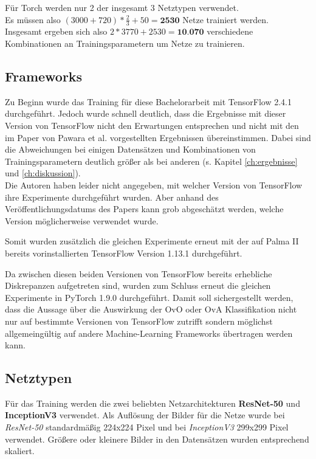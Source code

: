 Für Torch \cite{pytorch} werden nur 2 der insgesamt 3 Netztypen verwendet.\\
Es müssen also $(3000 + 720) * \frac{2}{3} + 50 = \textbf{2530}$ Netze trainiert werden.\\

Insgesamt ergeben sich also $2 * 3770 + 2530 = \textbf{10.070}$ verschiedene Kombinationen an Trainingsparametern um Netze zu trainieren.

\subsection{Frameworks}
Zu Beginn wurde das Training für diese Bachelorarbeit mit TensorFlow 2.4.1 \cite{tensorflow} durchgeführt. Jedoch wurde schnell deutlich, dass die Ergebnisse mit dieser Version von TensorFlow nicht den Erwartungen entsprechen und nicht mit den im Paper von Pawara et al. \cite{pawaraPaper} vorgestellten Ergebnissen übereinstimmen. Dabei sind die Abweichungen bei einigen Datensätzen und Kombinationen von Trainingsparametern deutlich größer als bei anderen (s. Kapitel \ref{ch:ergebnisse} und \ref{ch:diskussion}). \\

Die Autoren haben leider nicht angegeben, mit welcher Version von TensorFlow \cite{tensorflow} ihre Experimente durchgeführt wurden. Aber anhand des\\ Veröffentlichungsdatums des Papers \cite{pawaraPaper} kann grob abgeschätzt werden, welche Version möglicherweise verwendet wurde.

Somit wurden zusätzlich die gleichen Experimente erneut mit der auf Palma II \cite{palma2} bereits vorinstallierten TensorFlow \cite{tensorflow} Version 1.13.1 durchgeführt.

Da zwischen diesen beiden Versionen von TensorFlow \cite{tensorflow} bereits erhebliche Diskrepanzen aufgetreten sind, wurden zum Schluss erneut die gleichen Experimente in PyTorch 1.9.0 \cite{pytorch} durchgeführt.
Damit soll sichergestellt werden, dass die Aussage über die Auswirkung der OvO oder OvA Klassifikation nicht nur auf bestimmte Versionen von TensorFlow \cite{tensorflow} zutrifft sondern möglichst allgemeingültig auf andere Machine-Learning Frameworks übertragen werden kann.


\subsection{Netztypen}
\label{ch:methodik_netze}
Für das Training werden die zwei beliebten Netzarchitekturen \textbf{ResNet-50} und \textbf{InceptionV3} verwendet. Als Auflösung der Bilder für die Netze wurde bei \textit{ResNet-50} standardmäßig 224x224 Pixel und bei \textit{InceptionV3} 299x299 Pixel verwendet. Größere oder kleinere Bilder in den Datensätzen wurden entsprechend skaliert.

